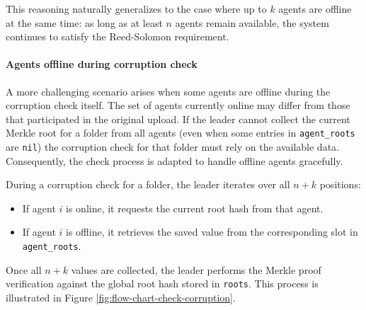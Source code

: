 This reasoning naturally generalizes to the case where up to $k$ agents are offline at the same time: as long as at least $n$ agents remain available, the system continues to satisfy the Reed-Solomon requirement.

\paragraph{Agents offline during corruption check}

A more challenging scenario arises when some agents are offline during the corruption check itself. The set of agents currently online may differ from those that participated in the original upload. If the leader cannot collect the current Merkle root for a folder from all agents (even when some entries in \texttt{agent\_roots} are \texttt{nil}) the corruption check for that folder must rely on the available data. Consequently, the check process is adapted to handle offline agents gracefully.

During a corruption check for a folder, the leader iterates over all $n+k$ positions:  
\begin{itemize}
    \item If agent $i$ is online, it requests the current root hash from that agent.  
    \item If agent $i$ is offline, it retrieves the saved value from the corresponding slot in \texttt{agent\_roots}.  
\end{itemize}

Once all $n+k$ values are collected, the leader performs the Merkle proof verification against the global root hash stored in \texttt{roots}. This process is illustrated in Figure \ref{fig:flow-chart-check-corruption}.  

